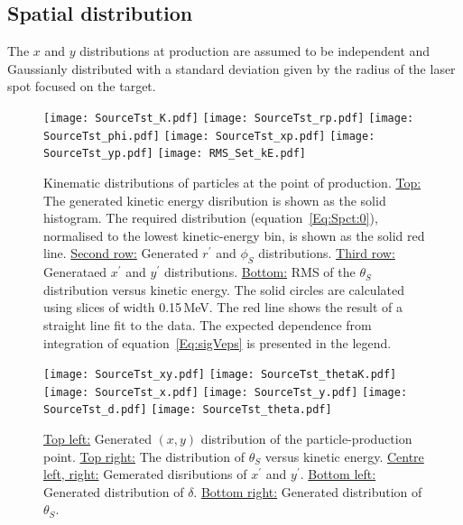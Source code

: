 \subsection{Spatial distribution}

The $x$ and $y$ distributions at production are assumed to be
independent and Gaussianly distributed with a standard deviation given
by the radius of the laser spot focused on the target.

\begin{figure}
  \begin{center}
    \texttt{[image: SourceTst\_K.pdf]}
    \texttt{[image: SourceTst\_rp.pdf]}
    \texttt{[image: SourceTst\_phi.pdf]}
    \texttt{[image: SourceTst\_xp.pdf]}
    \texttt{[image: SourceTst\_yp.pdf]}
    \texttt{[image: RMS\_Set\_kE.pdf]}
  \end{center}
  \caption{Kinematic distributions of particles at the point of
    production.
    \underline{Top:} The generated kinetic energy disribution is shown
    as the solid histogram. 
    The required distribution (equation~\ref{Eq:Spct:0}), normalised
    to the lowest kinetic-energy bin, is shown as the solid red line.
    \underline{Second row:} Generated $r^\prime$ and $\phi_S$
    distributions. 
    \underline{Third row:} Generataed $x^\prime$ and $y^\prime$
    distributions. 
    \underline{Bottom:} RMS of the $\theta_S$ distribution versus
    kinetic energy.
    The solid circles are calculated using slices of width 0.15\,MeV.
    The red line shows the result of a straight line fit to the data.
    The expected dependence from integration of
    equation~\ref{Eq:sigVeps} is presented in the legend.
  }
  \label{Fig:LsrDrvSrc:Dists}
\end{figure}

\begin{figure}
  \begin{center}
    \texttt{[image: SourceTst\_xy.pdf]}
    \texttt{[image: SourceTst\_thetaK.pdf]}
    \texttt{[image: SourceTst\_x.pdf]}
    \texttt{[image: SourceTst\_y.pdf]}
    \texttt{[image: SourceTst\_d.pdf]}
    \texttt{[image: SourceTst\_theta.pdf]}
  \end{center}
  \caption{
    \underline{Top left:} Generated $(x, y)$ distribution of the
    particle-production point.
    \underline{Top right:} The distribution of $\theta_S$ versus
    kinetic energy.
    \underline{Centre left, right:} Gemerated disributions of
    $x^\prime$ and $y^\prime$.
    \underline{Bottom left:} Generated distribution of $\delta$.
    \underline{Bottom right:} Generated distribution of $\theta_S$.
  }
  \label{Fig:LsrDrvSrc:Dists}
\end{figure}

